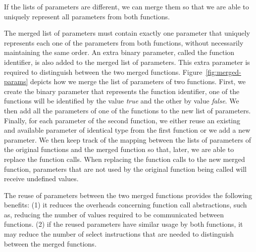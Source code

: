 
If the lists of parameters are different, we can merge them so that we are able
to uniquely represent all parameters from both functions.

The merged list of parameters must contain exactly one parameter that uniquely
represents each one of the parameters from both functions, without necessarily
maintaining the same order.
An extra binary parameter, called the function identifier, is also added to the
merged list of parameters.
This extra parameter is required to distinguish between the two merged functions.
Figure~\ref{fig:merged-params} depicts how we merge the list of parameters of
two functions.
First, we create the binary parameter that represents the function identifier,
one of the functions will be identified by the value \textit{true} and the other
by value \textit{false}.
We then add all the parameters of one of the functions to the new list of
parameters.
Finally, for each parameter of the second function, we either reuse an existing
and available parameter of identical type from the first function or we add a
new parameter.
We then keep track of the mapping between the lists of parameters of the
original functions and the merged function so that, later, we are able to
replace the function calls.
When replacing the function calls to the new merged function, parameters that
are not used by the original function being called will receive undefined values.

The reuse of parameters between the two merged functions provides the following
benefits:
(1) it reduces the overheads concerning function call abstractions, such as,
reducing the number of values required to be communicated between functions.
(2) if the reused parameters have similar usage by both functions, it may reduce
the number of select instructions that are needed to distinguish between the
merged functions.

